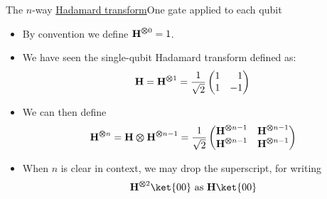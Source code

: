 \begin{frame}{The $n$-way \href{https://en.wikipedia.org/wiki/Hadamard_transform}{Hadamard transform}}{One \Hadamard{} gate applied to each qubit}

\begin{itemize}[<+->]
    \item By convention we define $\mbox{\bfseries{\textrm{H}}}^{\bm{\otimes} 0}=1$.
    \item We have seen the single-qubit Hadamard transform \Hadamard{} defined as:
    \[
        \Hadamard = \TensSupProd{\Hadamard}{1} = \HMatrix{}
    \]
    \item We can then define
    \[  \TensSupProd{\Hadamard}{n} = \TensProd{\Hadamard}{\TensSupProd{\Hadamard}{n-1}} = \SQBG{\RootTwo}{\TensSupProd{\Hadamard}{n-1}}{\TensSupProd{\Hadamard}{n-1}}{\TensSupProd{\Hadamard}{n-1}}{\TensSupProd{\Hadamard}{n-1}}
    \]
    \item When $n$ is clear in context, we may drop the superscript, for writing
    \[
       \TensSupProd{\Hadamard}{2} \ket{00} \mbox{ as }
       \Hadamard \ket{00}
    \]
\end{itemize}
    
\end{frame}

